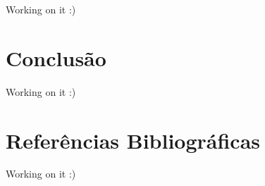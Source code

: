\documentclass[
]{book}
\begin{document}
Working on it :)

\hypertarget{conclusuxe3o}{%
\chapter{Conclusão}\label{conclusuxe3o}}

Working on it :)

\hypertarget{referuxeancias-bibliogruxe1ficas}{%
\chapter*{Referências Bibliográficas}\label{referuxeancias-bibliogruxe1ficas}}

Working on it :)

  
\end{document}
